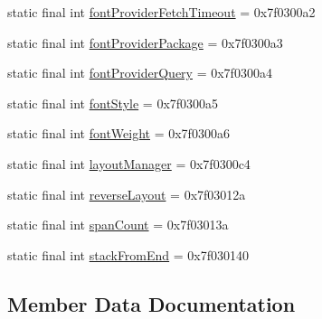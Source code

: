 \begin{DoxyCompactItemize}
\item 
static final int \mbox{\hyperlink{classandroid_1_1support_1_1v7_1_1recyclerview_1_1R_1_1attr_a48a3c42cf50b019f569a0b86e6e4afd7}{font\+Provider\+Fetch\+Timeout}} = 0x7f0300a2
\item 
static final int \mbox{\hyperlink{classandroid_1_1support_1_1v7_1_1recyclerview_1_1R_1_1attr_ae960c7185302cd8f4ee924994e5b7703}{font\+Provider\+Package}} = 0x7f0300a3
\item 
static final int \mbox{\hyperlink{classandroid_1_1support_1_1v7_1_1recyclerview_1_1R_1_1attr_ab18473f55a4927e934396f00882127c6}{font\+Provider\+Query}} = 0x7f0300a4
\item 
static final int \mbox{\hyperlink{classandroid_1_1support_1_1v7_1_1recyclerview_1_1R_1_1attr_a68d79f99d5ce3963517b2758fb38a19d}{font\+Style}} = 0x7f0300a5
\item 
static final int \mbox{\hyperlink{classandroid_1_1support_1_1v7_1_1recyclerview_1_1R_1_1attr_afd7f9436a411f403861940701bdfd176}{font\+Weight}} = 0x7f0300a6
\item 
static final int \mbox{\hyperlink{classandroid_1_1support_1_1v7_1_1recyclerview_1_1R_1_1attr_a66e095b5e4bb10f4a6b1adc05e6e0ea1}{layout\+Manager}} = 0x7f0300c4
\item 
static final int \mbox{\hyperlink{classandroid_1_1support_1_1v7_1_1recyclerview_1_1R_1_1attr_a3260f6f39d728308f292d24f97e646d3}{reverse\+Layout}} = 0x7f03012a
\item 
static final int \mbox{\hyperlink{classandroid_1_1support_1_1v7_1_1recyclerview_1_1R_1_1attr_a921f3d6f2a6673a0ea63b48e0fddf7d3}{span\+Count}} = 0x7f03013a
\item 
static final int \mbox{\hyperlink{classandroid_1_1support_1_1v7_1_1recyclerview_1_1R_1_1attr_ad048157c30076371166ead7bb83de5f3}{stack\+From\+End}} = 0x7f030140
\end{DoxyCompactItemize}


\subsection{Member Data Documentation}
\mbox{\label{classandroid_1_1support_1_1v7_1_1recyclerview_1_1R_1_1attr_a5aa1b17458ce7df6b20a60420b248996}} 
